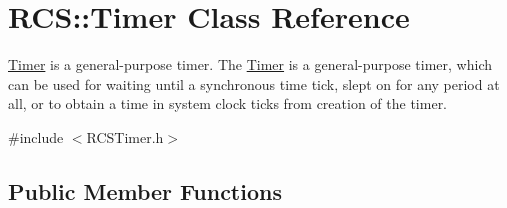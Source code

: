 \hypertarget{classRCS_1_1Timer}{\section{R\-C\-S\-:\-:Timer Class Reference}
\label{classRCS_1_1Timer}
}


\hyperlink{classRCS_1_1Timer}{Timer} is a general-\/purpose timer. The \hyperlink{classRCS_1_1Timer}{Timer} is a general-\/purpose timer, which can be used for waiting until a synchronous time tick, slept on for any period at all, or to obtain a time in system clock ticks from creation of the timer.  




{\ttfamily \#include $<$R\-C\-S\-Timer.\-h$>$}

\subsection*{Public Member Functions}
